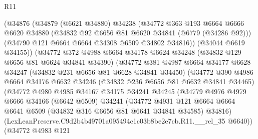 \begin{lexlean}{R11}
\begin{coremodule}
                    (@34876
                      (@34879
                        (@6621 @34880)
                        @34238
                        (@34772
                          @363
                          @193
                          @6664
                          @6666
                          @6620
                          @34880
                          (@34832 @92 @6656 @81 @6620 @34841 (@6779 (@34286 @92)))
                          (@34790 @121 @6664 @6664 @34308 @6509 @34802 @34816))
                        (@34044 @6619 @34155))
                      (@34772
                        @372
                        @4988
                        @6664
                        @34178
                        @6624
                        @34248
                        (@34832 @129 @6656 @81 @6624 @34841 @34390)
                        (@34772
                          @381
                          @4987
                          @6664
                          @34177
                          @6628
                          @34247
                          (@34832 @231 @6656 @81 @6628 @34841 @34450)
                          (@34772
                            @390
                            @4986
                            @6664
                            @34176
                            @6632
                            @34246
                            (@34832 @236 @6656 @81 @6632 @34841 @34465)
                            (@34772
                              @4980
                              @4985
                              @34167
                              @34175
                              @34241
                              @34245
                              (@34779
                                @4976
                                @4979
                                @6666
                                @34166
                                (@6642 @6509)
                                @34241
                                (@34772
                                  @4931
                                  @121
                                  @6664
                                  @6664
                                  @6641
                                  @6509
                                  (@34832 @316 @6656 @81 @6641 @34841 @34585)
                                  @34816)
                                (LexLeanPreserve.C9d2b4b49701a095494c1c03b8be2e7cb.R11.__rel_35
                                  @6640))
                              (@34772
                                @4983
                                @121

\end{coremodule}
\end{lexlean}
